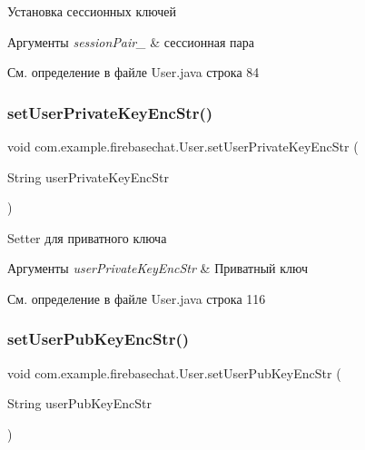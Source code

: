 Установка сессионных ключей 


\begin{DoxyParams}{Аргументы}
{\em session\+Pair\+\_\+} & сессионная пара \\
\hline
\end{DoxyParams}


См. определение в файле User.\+java строка 84

\mbox{\label{classcom_1_1example_1_1firebasechat_1_1_user_a4cef7096288a776f77934c2cd8f84a72}} 
\subsubsection{\texorpdfstring{set\+User\+Private\+Key\+Enc\+Str()}{setUserPrivateKeyEncStr()}}
{\footnotesize\ttfamily void com.\+example.\+firebasechat.\+User.\+set\+User\+Private\+Key\+Enc\+Str (\begin{DoxyParamCaption}\item[{String}]{user\+Private\+Key\+Enc\+Str }\end{DoxyParamCaption})}



Setter для приватного ключа 


\begin{DoxyParams}{Аргументы}
{\em user\+Private\+Key\+Enc\+Str} & Приватный ключ \\
\hline
\end{DoxyParams}


См. определение в файле User.\+java строка 116

\mbox{\label{classcom_1_1example_1_1firebasechat_1_1_user_aecc22b4b773ae3ba00ad0c7ed4db4340}} 
\subsubsection{\texorpdfstring{set\+User\+Pub\+Key\+Enc\+Str()}{setUserPubKeyEncStr()}}
{\footnotesize\ttfamily void com.\+example.\+firebasechat.\+User.\+set\+User\+Pub\+Key\+Enc\+Str (\begin{DoxyParamCaption}\item[{String}]{user\+Pub\+Key\+Enc\+Str }\end{DoxyParamCaption})}



